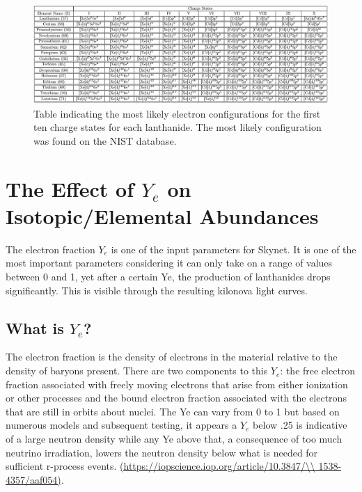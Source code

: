 \documentclass[11pt,a4paper]{article}
\begin{document}
\begin{figure}[H]
  \includegraphics[scale = .65]{configurations.png}
  \caption{Table indicating the most likely electron configurations for the first ten charge states for each lanthanide. The most likely configuration was found on the NIST database.}
\end{figure}




\section{The Effect of $Y_e$ on Isotopic/Elemental Abundances}  

The electron fraction $Y_e$ is one of the input parameters for Skynet. It is one of the most important parameters considering it can only take on a range of values between 0 and 1, yet after a certain Ye, the production of lanthanides drops significantly. This is visible through the resulting kilonova light curves. 

\subsection{What is $Y_e$?}

The electron fraction is the density of electrons in the material relative to the density of baryons present. There are two components to this $Y_e$: the free electron fraction associated with freely moving electrons that arise from either ionization or other processes and the bound electron fraction associated with the electrons that are still in orbits about nuclei. The Ye can vary from 0 to 1 but based on numerous models and subsequent testing, it appears a $Y_e$ below .25 is indicative of a large neutron density while any Ye above that, a consequence of too much neutrino irradiation, lowers the neutron density below what is needed for sufficient r-process events. \url{(https://iopscience.iop.org/article/10.3847/\\ 1538-4357/aaf054)}.
\end{document}
